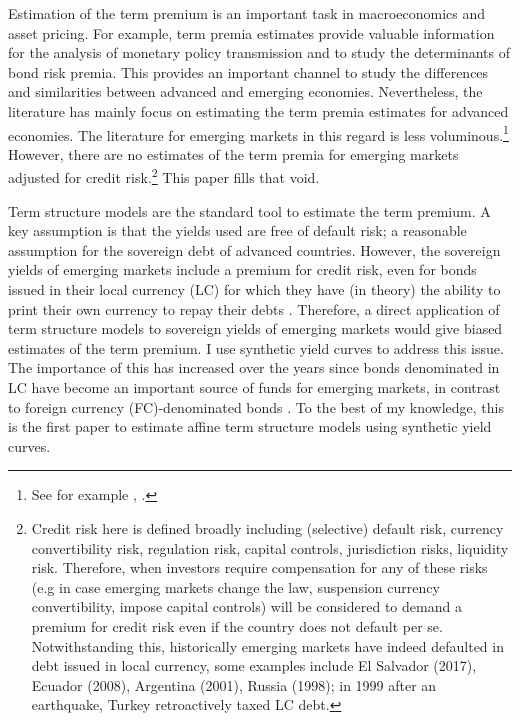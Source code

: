 Estimation of the term premium is an important task in macroeconomics and asset pricing. For example, term premia estimates provide valuable information for the analysis of monetary policy transmission and to study the determinants of bond risk premia. This provides an important channel to study the differences and similarities between advanced and emerging economies. Nevertheless, the literature has mainly focus on estimating the term premia estimates for advanced economies. The literature for emerging markets in this regard is less voluminous.\footnote{See for example \cite*{DePooter_etal:2013}, \cite*{BlakeRuleRummel:2015}.} However, there are no estimates of the term premia for emerging markets adjusted for credit risk.\footnote{Credit risk here is defined broadly including (selective) default risk, currency convertibility risk, regulation risk, capital controls, jurisdiction risks, liquidity risk. Therefore, when investors require compensation for any of these risks (e.g in case emerging markets change the law, suspension currency convertibility, impose capital controls) will be considered to demand a premium for credit risk even if the country does not default per se. Notwithstanding this, historically emerging markets have indeed defaulted in debt issued in local currency, some examples include El Salvador (2017), Ecuador (2008), Argentina (2001), Russia (1998); in 1999 after an earthquake, Turkey retroactively taxed LC debt.} This paper fills that void.

Term structure models are the standard tool to estimate the term premium. A key assumption is that the yields used are free of default risk; a reasonable assumption for the sovereign debt of advanced countries. However, the sovereign yields of emerging markets include a premium for credit risk, even for bonds issued in their local currency (LC) for which they have (in theory) the ability to print their own currency to repay their debts \citep{DuSchreger:2016a}. Therefore, a direct application of term structure models to sovereign yields of emerging markets would give biased estimates of the term premium. I use synthetic yield curves to address this issue. The importance of this has increased over the years since bonds denominated in LC have become an important source of funds for emerging markets, in contrast to foreign currency (FC)-denominated bonds \citep{DuSchreger:2016b}. To the best of my knowledge, this is the first paper to estimate affine term structure models using synthetic yield curves.

